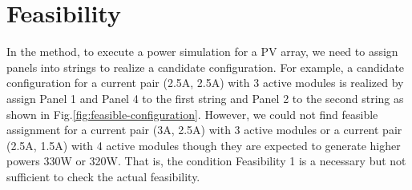 \documentclass[conference]{IEEEtran}
\begin{document}





\section{Feasibility}\label{Sec4}
In the method\cite{orozco2016optimized}, to execute a power simulation for a PV array, we need to assign panels into strings to realize a candidate configuration. For example, a candidate configuration for a current pair (2.5A, 2.5A) with 3 active modules is realized by assign Panel 1 and Panel 4 to the first string and Panel 2 to the second string as shown in Fig.\ref{fig:feasible-configuration}. However, we could not find feasible assignment for a current pair (3A, 2.5A) with 3 active modules or a current pair (2.5A, 1.5A) with 4 active modules though they are expected to generate higher powers 330W or 320W. That is, the condition Feasibility 1 is a necessary but not sufficient to check the actual feasibility.
\end{document}
